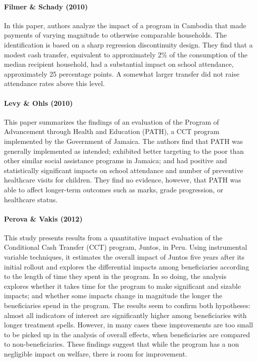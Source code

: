 \documentclass[a4paper, 10pt]{article}
\begin{document}
\paragraph{Filmer \& Schady (2010)}

In this paper, authors analyze the impact of a program in Cambodia that made payments of varying magnitude to otherwise comparable households. The identification is based on a sharp regression discontinuity design. They find that a modest cash transfer, equivalent to approximately 2\% of the consumption of the median recipient household, had a substantial impact on school attendance, approximately 25 percentage points. A somewhat larger transfer did not raise attendance rates above this level.

\paragraph{Levy \& Ohls (2010)}

This paper summarizes the findings of an evaluation of the Program of Advancement through Health and Education (PATH), a CCT program implemented by the Government of Jamaica. The authors find that PATH was generally implemented as intended; exhibited better targeting to the poor than other similar social assistance programs in Jamaica; and had positive and statistically significant impacts on school attendance and number of preventive healthcare visits for children. They find no evidence, however, that PATH was able to affect longer-term outcomes such as marks, grade progression, or healthcare status.

\paragraph{Perova \& Vakis (2012)}

This study presents results from a quantitative impact evaluation of the Conditional Cash Transfer (CCT) program, Juntos, in Peru. Using instrumental variable techniques, it estimates the overall impact of Juntos five years after its initial rollout and explores the differential impacts among beneficiaries according to the length of time they spent in the program. In so doing, the analysis explores whether it takes time for the program to make significant and sizable impacts; and whether some impacts change in magnitude the longer the beneficiaries spend in the program. The results seem to confirm both hypotheses: almost all indicators of interest are significantly higher among beneficiaries with longer treatment spells. However, in many cases these improvements are too small to be picked up in the analysis of overall effects, when beneficiaries are compared to non-beneficiaries. These findings suggest that while the program has a non negligible impact on welfare, there is room for improvement.


\end{document}
